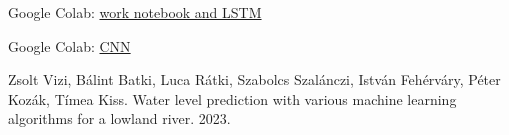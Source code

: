 \documentclass{article}
\begin{document}
Google Colab:
\href{https://colab.research.google.com/drive/1ZobMWBW76xJHmeTsbXmjmgCzcv5sGrSV?usp=sharing}{work
notebook and LSTM}

Google Colab:
\href{https://colab.research.google.com/drive/1TM0TM2p8cphnl7WuYu9bTIFMF2lW8gyv?usp=sharing}{CNN}

\begin{thebibliography}{1}
  \label{docs-internal-guid-0a5e5cca-7fff-6f48-cf8a-a203f7614dd1}Zsolt
  Vizi, B{\'a}lint Batki, Luca R{\'a}tki, Szabolcs Szal{\'a}nczi, Istv{\'a}n
  Feh{\'e}rv{\'a}ry, P{\'e}ter Koz{\'a}k, T{\'i}mea Kiss. {\newblock}Water
  level prediction with various machine learning algorithms for a lowland
  river. {\newblock}2023.{\newblock}
\end{thebibliography}
\end{document}
